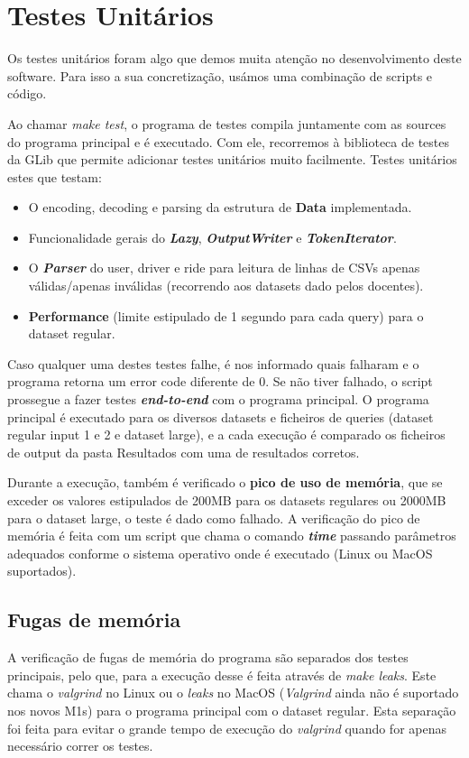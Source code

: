 \documentclass{article}
\begin{document}
    \section{Testes Unitários}
        Os testes unitários foram algo que demos muita atenção no desenvolvimento deste software.
        Para isso a sua concretização, usámos uma combinação de scripts e código.
        
        \medskip
        Ao chamar \textit{make test}, o programa de testes compila juntamente com as sources do programa principal e é executado.
        Com ele, recorremos à biblioteca de testes da GLib que permite adicionar testes unitários
        muito facilmente. Testes unitários estes que testam:
        \begin{itemize}
            \item O encoding, decoding e parsing da estrutura de \textbf{Data} implementada.
            \item Funcionalidade gerais do \textit{\textbf{Lazy}}, \textit{\textbf{OutputWriter}} e \textit{\textbf{TokenIterator}}.
            \item O \textit{\textbf{Parser}} do user, driver e ride para leitura de linhas de CSVs apenas válidas/apenas inválidas (recorrendo aos datasets dado pelos docentes).
            \item \textbf{Performance} (limite estipulado de 1 segundo para cada query) para o dataset regular.
        \end{itemize}
        Caso qualquer uma destes testes falhe, é nos informado quais falharam e o programa retorna um error code diferente de 0.
        Se não tiver falhado, o script prossegue a fazer testes \textit{\textbf{end-to-end}} com o programa principal.
        O programa principal é executado para os diversos datasets e ficheiros de queries (dataset regular input 1 e 2 e dataset large),
        e a cada execução é comparado os ficheiros de output da pasta Resultados com uma de resultados corretos.
        
        Durante a execução, também é verificado o \textbf{pico de uso de memória}, que se exceder os valores estipulados de 
        200MB para os datasets regulares ou 2000MB para o dataset large, o teste é dado como falhado.
        A verificação do pico de memória é feita com um script que chama o comando \textit{\textbf{time}}
        passando parâmetros adequados conforme o sistema operativo onde é executado (Linux ou MacOS suportados).
        
        \subsection{Fugas de memória}
        A verificação de fugas de memória do programa são separados dos testes principais, pelo que,
        para a execução desse é feita através de \textit{make leaks}. Este chama o \textit{valgrind}
        no Linux ou o \textit{leaks} no MacOS (\textit{Valgrind} ainda não é suportado nos novos M1s) para 
        o programa principal com o dataset regular. Esta separação foi feita para evitar o grande
        tempo de execução do \textit{valgrind} quando for apenas necessário correr os testes.
        
\end{document}
